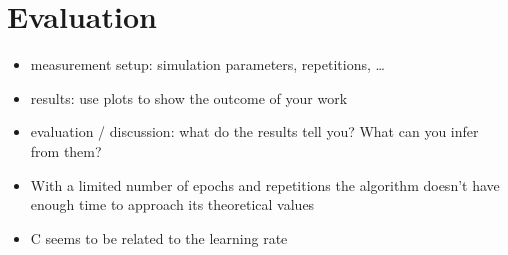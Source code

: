 \section{Evaluation}

\begin{itemize}
\item measurement setup: simulation parameters, repetitions, \dots
\item results: use plots to show the outcome of your work
\item evaluation / discussion: what do the results tell you? What can you infer from them?
\end{itemize}


\begin{itemize}
    \item With a limited number of epochs and repetitions the algorithm doesn't have enough time to approach its theoretical values
    \item C seems to be related to the learning rate
\end{itemize}